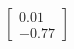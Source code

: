 \documentclass[preview]{standalone}
\begin{document}
\begin{align*}
\begin{bmatrix} 0.01 \\ -0.77 \end{bmatrix}
\end{align*}
\end{document}
